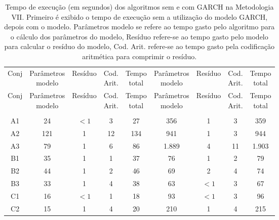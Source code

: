 \begin{center}
\begin{longtable}{ccccc|cccc}
\toprule
\rowcolor{white}
\caption[Metodologia VII: tempo de execução]{Tempo de execução (em segundos)
dos algoritmos sem e com GARCH na Metodologia VII. Primeiro é exibido o tempo de
execução sem a utilização do modelo GARCH, depois com o modelo. Parâmetros
modelo se refere ao tempo gasto pelo algoritmo para o cálculo dos parâmetros do
modelo, Resíduo refere-se ao tempo gasto pelo modelo para calcular o resíduo do
modelo, Cod. Arit. refere-se ao tempo gasto pela codificação aritmética para
comprimir o resíduo.} \label{tab:EvolucaoEntropiaMet7}\\
\midrule
Conj & \specialcell{Parâmetros\\modelo} &
Resíduo & \specialcell{Cod.\\Arit.} & \specialcell{Tempo\\total} &
\specialcell{Parâmetros\\modelo} &
Resíduo & \specialcell{Cod.\\Arit.} & \specialcell{Tempo\\total} \\
\midrule
\endfirsthead 
\midrule
\rowcolor{white}
Conj & \specialcell{Parâmetros\\modelo} &
Resíduo & \specialcell{Cod.\\Arit.} & \specialcell{Tempo\\total} &
\specialcell{Parâmetros\\modelo} &
Resíduo & \specialcell{Cod.\\Arit.} & \specialcell{Tempo\\total} \\
\toprule
\endhead
\midrule \\ %
\endfoot
\bottomrule 
\endlastfoot
A1&24&$<1$&3&27&356&1&3&359\\
A2&121&1&12&134&941&1&3&944\\
A3&79&1&6&86&1.889&4&11&1.903\\
B1&35&1&1&37&76&1&2&79\\
B2&44&1&2&46&69&2&4&74\\
B3&33&1&4&38&63&$<1$&3&67\\
C1&16&$<1$&1&18&93&$<1$&3&96\\
C2&15&1&4&20&210&1&4&215\\

\end{longtable}
\end{center}
